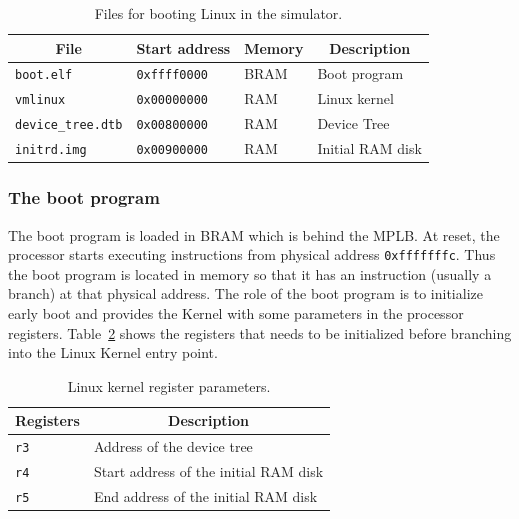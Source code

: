 \begin{table}[!h]
	\begin{center}
		\begin{tabular}{|l|l|l|l|}
		\hline
		\multicolumn{1}{|c|}{\textbf{File}} & \multicolumn{1}{|c|}{\textbf{Start address}} & \multicolumn{1}{|c|}{\textbf{Memory}} & \multicolumn{1}{|c|}{\textbf{Description}}\\
		\hline
		\texttt{boot.elf} & \texttt{0xffff0000} & BRAM & Boot program\\
		\hline
		\texttt{vmlinux} & \texttt{0x00000000} & RAM & Linux kernel\\
		\hline
		\texttt{device\_tree.dtb} & \texttt{0x00800000} & RAM & Device Tree\\
		\hline
		\texttt{initrd.img} & \texttt{0x00900000} & RAM & Initial RAM disk\\
		\hline
		\end{tabular}
	\end{center}
	\caption{Files for booting Linux in the simulator.}
	\label{table:linux_files}
\end{table}

\subsubsection{The boot program}
\label{boot_program}

The boot program is loaded in BRAM which is behind the MPLB.
At reset, the processor starts executing instructions from physical address \texttt{0xfffffffc}.
Thus the boot program is located in memory so that it has an instruction (usually a branch) at that physical address.
The role of the boot program is to initialize early boot and provides the Kernel with some parameters in the processor registers.
Table~\ref{table:linux_register_parameters} shows the registers that needs to be initialized before branching into the Linux Kernel entry point.

\begin{table}[p]
	\begin{center}
		\begin{tabular}{|l|l|}
		\hline
		\multicolumn{1}{|c|}{\textbf{Registers}} & \multicolumn{1}{|c|}{\textbf{Description}}\\
		\hline
		\texttt{r3} & Address of the device tree\\
		\hline
		\texttt{r4} & Start address of the initial RAM disk\\
		\hline
		\texttt{r5} & End address of the initial RAM disk\\
		\hline
		\end{tabular}
	\end{center}
	\caption{Linux kernel register parameters.}
	\label{table:linux_register_parameters}
\end{table}

